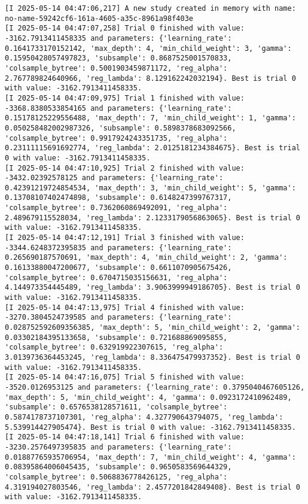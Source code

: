 \documentclass[
  letterpaper,
  DIV=11,
  numbers=noendperiod]{scrreprt}
\begin{document}
\begin{verbatim}
[I 2025-05-14 04:47:06,217] A new study created in memory with name: no-name-59242cf6-161a-4605-a35c-8961a98f403e
[I 2025-05-14 04:47:07,258] Trial 0 finished with value: -3162.7913411458335 and parameters: {'learning_rate': 0.1641733170152142, 'max_depth': 4, 'min_child_weight': 3, 'gamma': 0.15950428057497823, 'subsample': 0.8687525001570833, 'colsample_bytree': 0.5001903459871172, 'reg_alpha': 2.767789824640966, 'reg_lambda': 8.129162242032194}. Best is trial 0 with value: -3162.7913411458335.
[I 2025-05-14 04:47:09,975] Trial 1 finished with value: -3368.8380533854165 and parameters: {'learning_rate': 0.15178125229556488, 'max_depth': 7, 'min_child_weight': 1, 'gamma': 0.050258482002987326, 'subsample': 0.5898378683092566, 'colsample_bytree': 0.9917924243351735, 'reg_alpha': 0.23111115691692774, 'reg_lambda': 2.0125181234384675}. Best is trial 0 with value: -3162.7913411458335.
[I 2025-05-14 04:47:10,925] Trial 2 finished with value: -3432.02392578125 and parameters: {'learning_rate': 0.42391219724854534, 'max_depth': 3, 'min_child_weight': 5, 'gamma': 0.13708107402474898, 'subsample': 0.6148247399767317, 'colsample_bytree': 0.7362060869492091, 'reg_alpha': 2.489679115528034, 'reg_lambda': 2.1233179056863065}. Best is trial 0 with value: -3162.7913411458335.
[I 2025-05-14 04:47:12,191] Trial 3 finished with value: -3344.6248372395835 and parameters: {'learning_rate': 0.265690187570691, 'max_depth': 4, 'min_child_weight': 2, 'gamma': 0.16133880047200677, 'subsample': 0.6611070905675426, 'colsample_bytree': 0.6704715035156631, 'reg_alpha': 4.144973354445489, 'reg_lambda': 3.9063999949186705}. Best is trial 0 with value: -3162.7913411458335.
[I 2025-05-14 04:47:13,975] Trial 4 finished with value: -3270.3804524739585 and parameters: {'learning_rate': 0.028752592609356385, 'max_depth': 5, 'min_child_weight': 2, 'gamma': 0.03302184395133658, 'subsample': 0.721688869095855, 'colsample_bytree': 0.632919922307615, 'reg_alpha': 3.0139736364453245, 'reg_lambda': 8.336475479937352}. Best is trial 0 with value: -3162.7913411458335.
[I 2025-05-14 04:47:16,075] Trial 5 finished with value: -3520.0126953125 and parameters: {'learning_rate': 0.3795040467605126, 'max_depth': 5, 'min_child_weight': 4, 'gamma': 0.0923172410962489, 'subsample': 0.6576538128571611, 'colsample_bytree': 0.5874178737107301, 'reg_alpha': 4.327790643794075, 'reg_lambda': 5.539914427905474}. Best is trial 0 with value: -3162.7913411458335.
[I 2025-05-14 04:47:18,141] Trial 6 finished with value: -3230.2576497395835 and parameters: {'learning_rate': 0.01887765935706954, 'max_depth': 7, 'min_child_weight': 4, 'gamma': 0.08395864006045435, 'subsample': 0.9650583569644329, 'colsample_bytree': 0.5068836778426125, 'reg_alpha': 4.319194027803546, 'reg_lambda': 2.4577201842849408}. Best is trial 0 with value: -3162.7913411458335.

\end{verbatim}
\end{document}
